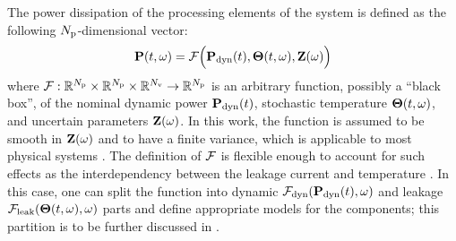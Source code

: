 The power dissipation of the processing elements of the system is defined as the following ${N_\text{p}}$-dimensional vector:
\begin{equation} \elabel{power-model}
  \vP(\t, \o) = \f\Big(\vP_\dyn(\t), \vTO(\t, \o), \vZ(\o)\Big)
\end{equation}
where $\mathcal{F}: \mathbb{R}^{N_\text{p}} \times \mathbb{R}^{N_\text{p}} \times \mathbb{R}^{N_\text{v}} \to \mathbb{R}^{N_\text{p}}$ is an arbitrary function, possibly a ``black box'', of the nominal dynamic power $\mathbf{P}_{\text{dyn}}(t)$, stochastic temperature ${\boldsymbol\Theta}(t, \omega)$, and uncertain parameters $\mathbf{Z}(\omega)$. In this work, the function is assumed to be smooth in $\mathbf{Z}(\omega)$ and to have a finite variance, which is applicable to most physical systems \cite{xiu2002}. The definition of $\mathcal{F}$ is flexible enough to account for such effects as the interdependency between the leakage current and temperature \cite{liu2007, srivastava2010}. In this case, one can split the function into dynamic $\mathcal{F}_{\text{dyn}}(\mathbf{P}_{\text{dyn}}(t), \omega)$ and leakage $\mathcal{F}_{\text{leak}}({\boldsymbol\Theta}(t, \omega), \omega)$ parts and define appropriate models for the components; this partition is to be further discussed in .
